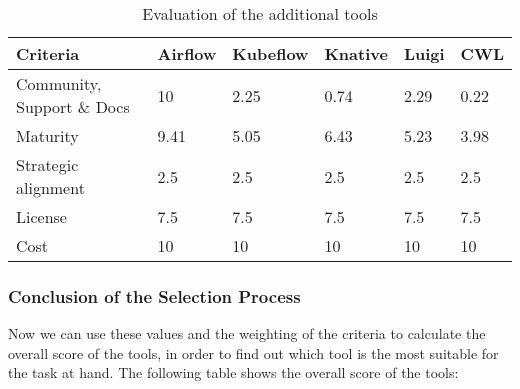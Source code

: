 \begin{table}[htb]
    \centering
    \begin{tabular}{|l|l|l|l|l|l|} \hline
        \textbf{Criteria}                                          & \textbf{Airflow}      & \textbf{Kubeflow}     & \textbf{Knative}      & \textbf{Luigi}        & \textbf{CWL}          \\ \hline
        Community, Support \& Docs                                 & 10                    & 2.25                  & 0.74                  & 2.29                  & 0.22                  \\ \hline
        Maturity                                                   & 9.41                  & 5.05                  & 6.43                  & 5.23                  & 3.98                  \\ \hline
        Strategic alignment                                        & 2.5                   & 2.5                   & 2.5                   & 2.5                   & 2.5                   \\ \hline
        License                                                    & 7.5                   & 7.5                   & 7.5                   & 7.5                   & 7.5                   \\ \hline
        Cost                                                      & 10                    & 10                    & 10                    & 10                    & 10                    \\ \hline

    \end{tabular}
    \caption{Evaluation of the additional tools}
    \label{tab:evaluation_of_the_additional_tools}
\end{table}

\subsubsection{Conclusion of the Selection Process}

Now we can use these values and the weighting of the criteria to calculate the overall score of the tools, in order to find out which tool is the most suitable for the task at hand.
The following table shows the overall score of the tools:

